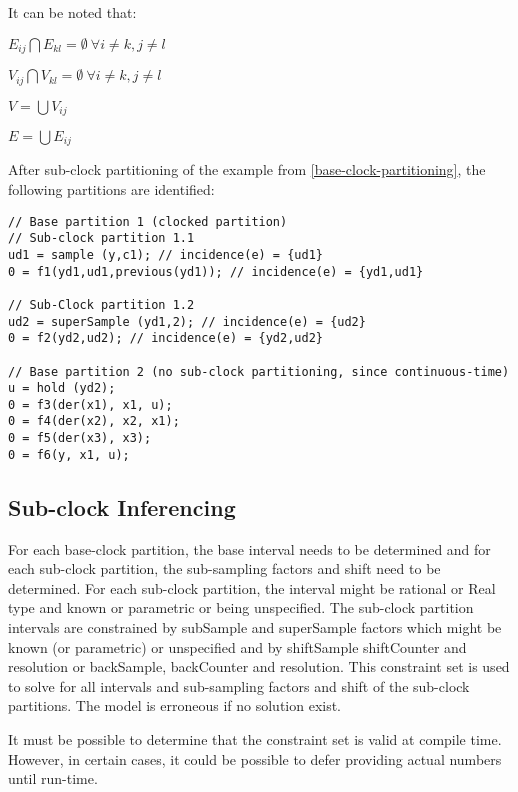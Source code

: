 It can be noted that:

$E_{ij} \bigcap E_{kl} = \emptyset~ \forall i\ne{}k, j\ne{}l$

$ V_{ij} \bigcap V_{kl} = \emptyset~ \forall i\ne{}k, j\ne{}l$

$V = \bigcup V_{ij}$

$E = \bigcup E_{ij}$

\begin{example}
After sub-clock partitioning of the example from \cref{base-clock-partitioning}, the following partitions are identified:
\begin{lstlisting}[language=modelica]
// Base partition 1 (clocked partition)
// Sub-clock partition 1.1
ud1 = sample (y,c1); // incidence(e) = {ud1}
0 = f1(yd1,ud1,previous(yd1)); // incidence(e) = {yd1,ud1}

// Sub-Clock partition 1.2
ud2 = superSample (yd1,2); // incidence(e) = {ud2}
0 = f2(yd2,ud2); // incidence(e) = {yd2,ud2}

// Base partition 2 (no sub-clock partitioning, since continuous-time)
u = hold (yd2);
0 = f3(der(x1), x1, u);
0 = f4(der(x2), x2, x1);
0 = f5(der(x3), x3);
0 = f6(y, x1, u);
\end{lstlisting}
\end{example}

\subsection{Sub-clock Inferencing}\label{sub-clock-inferencing}

For each base-clock partition, the base interval needs to be determined
and for each sub-clock partition, the sub-sampling factors and shift
need to be determined. For each sub-clock partition, the interval might
be rational or Real type and known or parametric or being unspecified.
The sub-clock partition intervals are constrained by subSample and
superSample factors which might be known (or parametric) or unspecified
and by shiftSample shiftCounter and resolution or backSample,
backCounter and resolution. This constraint set is used to solve for all
intervals and sub-sampling factors and shift of the sub-clock
partitions. The model is erroneous if no solution exist.

\begin{nonnormative}
It must be possible to determine that the constraint set is valid at compile time.  However, in certain cases, it could be possible to defer providing actual numbers until run-time.
\end{nonnormative}

